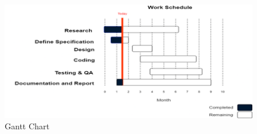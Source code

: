 \begin{figure}[H]
	\centering
	\includegraphics[width=160mm]{images/ganttchart.png}
	\caption{Gantt Chart} %
	\label{figganttchart} %
\end{figure}




\renewcommand\bibname{References} %



